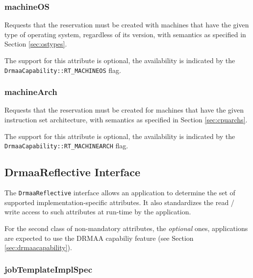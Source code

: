 \documentclass{article}
\newcommand{\h}[1]{\lstinline|#1|}
\newcommand{\rat}[1]{}
\begin{document}
\rat{May 18th 2011 conf call identified the different understandings of memory reservation.}

\subsubsection{machineOS}

Requests that the reservation must be created with machines that have the given type of operating system, regardless of its version, with semantics as specified in Section \ref{sec:ostypes}.

The support for this attribute is optional, the availability is indicated by the \h{DrmaaCapability::RT_MACHINEOS} flag.

\rat{May 18th 2011 conf call identified support in DRM systems to be mainly given by additional configuration only.}

\subsubsection{machineArch}

Requests that the reservation must be created for machines that have the given instruction set architecture,  with semantics as specified in Section \ref{sec:cpuarchs}.

The support for this attribute is optional, the availability is indicated by the \h{DrmaaCapability::RT_MACHINEARCH} flag. 

\rat{May 18th 2011 conf call identified support in DRM systems to be mainly given by additional configuration only.}

\subsection{DrmaaReflective Interface}
\label{sec:drmaareflective}

The \h{DrmaaReflective} interface allows an application to determine the set of supported implementation-specific attributes. It also standardizes the read / write access to such attributes at run-time by the application.

For the second class of non-mandatory attributes, the \emph{optional} ones, applications are expected to use the DRMAA capabiliy feature (see Section \ref{sec:drmaacapability}).



\subsubsection{jobTemplateImplSpec}
\end{document}
